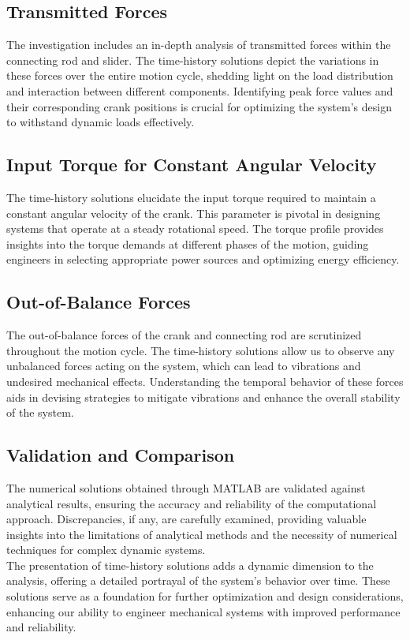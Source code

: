 \documentclass[12pt, titlepage]{article}
\begin{document}
\subsection{Transmitted Forces}

The investigation includes an in-depth analysis of transmitted forces within
the connecting rod and slider. The time-history solutions depict the variations
in these forces over the entire motion cycle, shedding light on the load
distribution and interaction between different components. Identifying peak
force values and their corresponding crank positions is crucial for optimizing
the system's design to withstand dynamic loads effectively.

\subsection{Input Torque for Constant Angular Velocity}

The time-history solutions elucidate the input torque required to maintain a
constant angular velocity of the crank. This parameter is pivotal in designing
systems that operate at a steady rotational speed. The torque profile provides
insights into the torque demands at different phases of the motion, guiding
engineers in selecting appropriate power sources and optimizing energy
efficiency.

\subsection{Out-of-Balance Forces}

The out-of-balance forces of the crank and connecting rod are scrutinized
throughout the motion cycle. The time-history solutions allow us to observe any
unbalanced forces acting on the system, which can lead to vibrations and
undesired mechanical effects. Understanding the temporal behavior of these
forces aids in devising strategies to mitigate vibrations and enhance the
overall stability of the system.

\subsection{Validation and Comparison}

The numerical solutions obtained through MATLAB are validated against
analytical results, ensuring the accuracy and reliability of the computational
approach. Discrepancies, if any, are carefully examined, providing valuable
insights into the limitations of analytical methods and the necessity of
numerical techniques for complex dynamic systems.\\[10pt]
The presentation of time-history solutions adds a dynamic dimension
to the analysis, offering a detailed portrayal of the system's behavior over
time. These solutions serve as a foundation for further optimization and design
considerations, enhancing our ability to engineer mechanical systems with
improved performance and reliability.
\newpage
\end{document}
